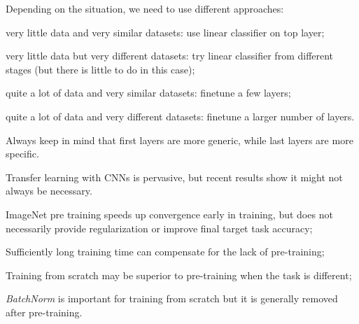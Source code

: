 Depending on the situation, we need to use different approaches:
\begin{myitem}
    \item very little data and very similar datasets: use linear classifier on top layer;
    \item very little data but very different datasets: try linear classifier from different stages (but there is little to do in this case);
    \item quite a lot of data and very similar datasets: finetune a few layers;
    \item quite a lot of data and very different datasets: finetune a larger number of layers.
\end{myitem}

Always keep in mind that first layers are more generic, while last layers are more specific.

Transfer learning with CNNs is pervasive, but recent results show it might not always be necessary.
\begin{myitem}
    \item ImageNet pre training speeds up convergence early in training, but does not necessarily provide regularization or improve final target task accuracy;
    \item Sufficiently long training time can compensate for the lack of pre-training;
    \item Training from scratch may be superior to pre-training when the task is different;
    \item \textit{BatchNorm} is important for training from scratch but it is generally removed after pre-training.
\end{myitem}
